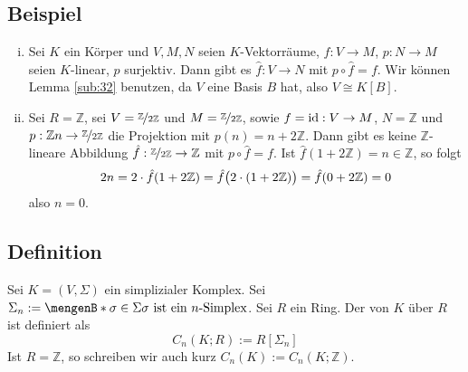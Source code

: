 \subsection[Beispiel für freie und nicht-freie Moduln]{Beispiel} %
\label{sub:33}
\begin{enumerate}[(i)]
	\item Sei $K$ ein Körper und $V,M,N$ seien $K$-Vektorräume, $f : V \to M$, $p : N \to M$ seien $K$-linear, $p$ surjektiv. Dann gibt es $\hat{f} : V \to N$ mit
	$p \circ \hat{f} = f$. Wir können Lemma \ref{sub:32} benutzen, da $V$ eine Basis $B$ hat, also $V \cong K[B]$.
	\item Sei $R=\mathds{Z}$, sei $V= \nicefrac{\mathds{Z}}{2 \mathds{Z}}$ und $M = \nicefrac{\mathds{Z}}{2 \mathds{Z}}$, sowie $f= \id : V \to M$, $N= \mathds{Z}$ und 
	$p : \mathds{Z}n \to \nicefrac{\mathds{Z}}{2 \mathds{Z}}$ die Projektion mit $p(n)= n + 2 \mathds{Z}$. Dann gibt es keine $\mathds{Z}$-lineare Abbildung 
	$\hat{f} : \nicefrac{\mathds{Z}}{2 \mathds{Z}} \to \mathds{Z}$ mit $p \circ \hat{f} = f$.
	Ist $\hat{f} (1+ 2 \mathds{Z}) = n \in \mathds{Z}$, so folgt 
	\[
		2 n = 2 \cdot \hat{f}(1+ 2 \mathds{Z}) = \hat{f} \enbrace[\big]{2 \cdot (1+ 2 \mathds{Z})} = \hat{f} (0+ 2 \mathds{Z}) =0
	\]
	also $n=0$.
\end{enumerate}

\subsection[Definition: $n$-ter Kettenmodul]{Definition} %
\label{sub:34}
Sei $K=(V, \Sigma)$ ein simplizialer Komplex. Sei $\Sigma_n := \set[\sigma \in \Sigma]{\sigma \text{ ist ein $n$-Simplex}}$. Sei $R$ ein Ring. Der 
 von $K$ über $R$ ist definiert als 
\[
	C_n(K;R) := R[\Sigma_n]
\]
Ist $R=\mathds{Z}$, so schreiben wir auch kurz $C_n(K) := C_n(K;\mathds{Z})$.

